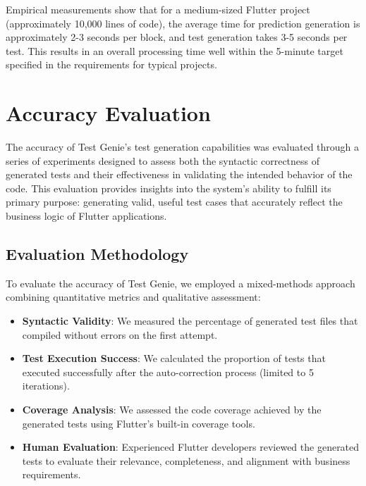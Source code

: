 Empirical measurements show that for a medium-sized Flutter project (approximately 10,000 lines of code), the average time for prediction generation is approximately 2-3 seconds per block, and test generation takes 3-5 seconds per test. This results in an overall processing time well within the 5-minute target specified in the requirements for typical projects.

\section{Accuracy Evaluation}

The accuracy of Test Genie's test generation capabilities was evaluated through a series of experiments designed to assess both the syntactic correctness of generated tests and their effectiveness in validating the intended behavior of the code. This evaluation provides insights into the system's ability to fulfill its primary purpose: generating valid, useful test cases that accurately reflect the business logic of Flutter applications.

\subsection{Evaluation Methodology}

To evaluate the accuracy of Test Genie, we employed a mixed-methods approach combining quantitative metrics and qualitative assessment:

\begin{itemize}
    \item \textbf{Syntactic Validity}: We measured the percentage of generated test files that compiled without errors on the first attempt.
    
    \item \textbf{Test Execution Success}: We calculated the proportion of tests that executed successfully after the auto-correction process (limited to 5 iterations).
    
    \item \textbf{Coverage Analysis}: We assessed the code coverage achieved by the generated tests using Flutter's built-in coverage tools.
    
    \item \textbf{Human Evaluation}: Experienced Flutter developers reviewed the generated tests to evaluate their relevance, completeness, and alignment with business requirements.
\end{itemize}

